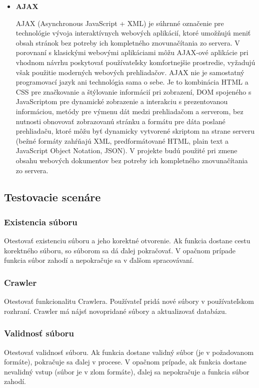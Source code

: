 \documentclass[12pt,a4paper]{article}
\begin{document}
\begin{itemize}
	\item{\bf AJAX} \par
	AJAX (Asynchronous JavaScript + XML) je súhrnné označenie pre technológie vývoja interaktívnych webových aplikácií, ktoré umožňujú meniť obsah stránok bez potreby ich kompletného znovunačítania zo servera. V porovnaní s klasickými webovými aplikáciami môžu AJAX-ové aplikácie pri vhodnom návrhu poskytovať používateľsky komfortnejšie prostredie, vyžadujú však použitie moderných webových prehliadačov. AJAX nie je samostatný programovací jazyk ani technológia sama o sebe. Je to kombinácia HTML a CSS pre značkovanie a štýlovanie informácií pri zobrazení, DOM spojeného s JavaScriptom pre dynamické zobrazenie a interakciu s prezentovanou informáciou, metódy pre výmenu dát medzi prehliadačom a serverom, bez nutnosti obnovovať zobrazovanú stránku a formátu pre dáta poslané prehliadaču, ktoré môžu byť dynamicky vytvorené skriptom na strane serveru (bežné formáty zahŕňajú XML, predformátované HTML, plain text a JavaScript Object Notation, JSON). V projekte budú použité pri zmene obsahu webových dokumentov bez potreby ich kompletného znovunačítania zo servera.
\end{itemize}

\subsection{Testovacie scenáre}

\subsubsection{Existencia súboru}
Otestovať existenciu súboru a jeho korektné otvorenie. Ak funkcia dostane cestu korektného súboru, so súborom sa dá ďalej pokračovať. V opačnom prípade funkcia súbor zahodí a nepokračuje sa v ďalšom spracovávaní.

\subsubsection{Crawler}
Otestovať funkcionalitu Crawlera. Používateľ pridá nové súbory v používateľskom rozhraní. Crawler má nájsť novopridané súbory a aktualizovať databázu. 

\subsubsection{Validnosť súboru}
Otestovať validnosť súboru. Ak funkcia dostane validný súbor (je v požadovanom formáte), pokračuje sa ďalej v procese. V opačnom prípade, ak funkcia dostane nevalidný vstup (súbor je v zlom formáte), ďalej sa nepokračuje a funkcia súbor zahodí.
\end{document}
